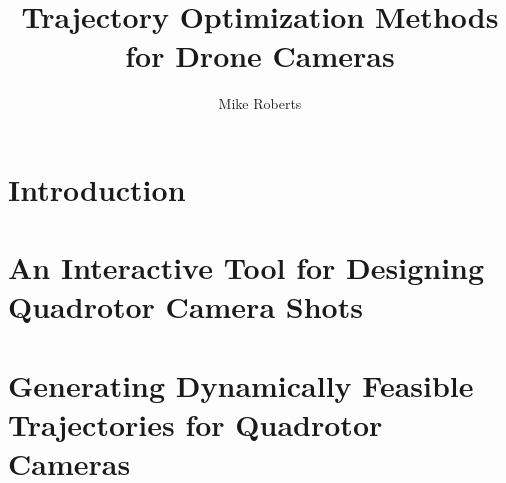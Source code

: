 \documentclass{report}
\begin{document}
\newcommand{\shortcite}[1]{\cite{#1}}

\newcommand\blfootnote[1]{%
  \begingroup
  \renewcommand\thefootnote{}\footnote{#1}%
  \addtocounter{footnote}{-1}%
  \endgroup
}

\title{Trajectory Optimization Methods for Drone Cameras}
\author{Mike Roberts}

\beforepreface




\afterpreface

\chapter{Introduction}



\chapter{An Interactive Tool for Designing Quadrotor Camera Shots}















\chapter{Generating Dynamically Feasible Trajectories for Quadrotor Cameras}









\end{document}

